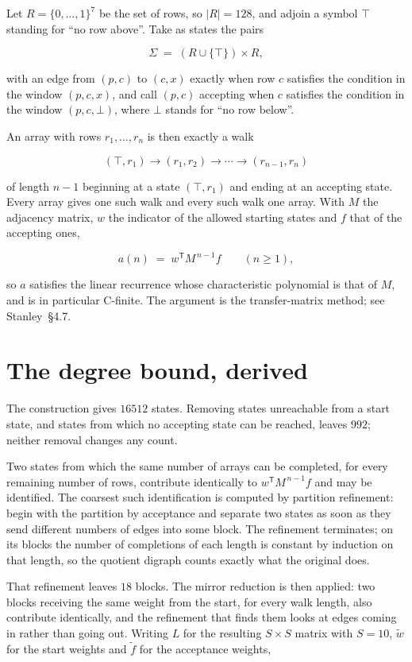 \documentclass[11pt]{article}
\theoremstyle{definition}
\begin{document}
Let $R = \{0,\dots,1\}^{7}$ be the set of rows, so $|R| = 128$, and adjoin a symbol $\top$ standing for ``no row above''. Take as states the pairs

\[\Sigma \;=\; (R \cup \{\top\}) \times R,\]

with an edge from $(p,c)$ to $(c,x)$ exactly when row $c$ satisfies the condition in the window $(p,c,x)$, and call $(p,c)$ accepting when $c$ satisfies the condition in the window $(p,c,\bot)$, where $\bot$ stands for ``no row below''.

An array with rows $r_1,\dots,r_n$ is then exactly a walk

\[(\top,r_1) \to (r_1,r_2) \to \cdots \to (r_{n-1},r_n)\]

of length $n-1$ beginning at a state $(\top,r_1)$ and ending at an accepting state. Every array gives one such walk and every such walk one array. With $M$ the adjacency matrix, $w$ the indicator of the allowed starting states and $f$ that of the accepting ones,

\[a(n) \;=\; w^{\mathsf T} M^{\,n-1} f \qquad (n \ge 1),\]

so $a$ satisfies the linear recurrence whose characteristic polynomial is that of $M$, and is in particular C-finite. The argument is the transfer-matrix method; see Stanley~\S4.7.

\section{The degree bound, derived}

The construction gives $16512$ states. Removing states unreachable from a start state, and states from which no accepting state can be reached, leaves $992$; neither removal changes any count.

Two states from which the same number of arrays can be completed, for every remaining number of rows, contribute identically to $w^{\mathsf T}M^{\,n-1}f$ and may be identified. The coarsest such identification is computed by partition refinement: begin with the partition by acceptance and separate two states as soon as they send different numbers of edges into some block. The refinement terminates; on its blocks the number of completions of each length is constant by induction on that length, so the quotient digraph counts exactly what the original does.

That refinement leaves $18$ blocks. The mirror reduction is then applied: two blocks receiving the same weight from the start, for every walk length, also contribute identically, and the refinement that finds them looks at edges coming in rather than going out. Writing $L$ for the resulting $S \times S$ matrix with $S = 10$, $\tilde w$ for the start weights and $\tilde f$ for the acceptance weights,
\end{document}
